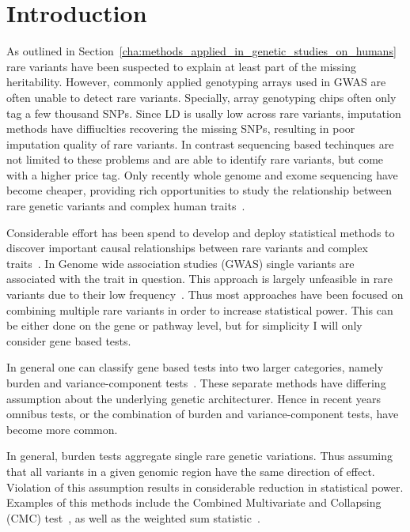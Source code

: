 \section{Introduction}
\label{sec:introduction}

As outlined in Section~\ref{cha:methods_applied_in_genetic_studies_on_humans} rare variants have been suspected to explain at least part of the missing heritability.
However, commonly applied genotyping arrays used in GWAS are often unable to detect rare variants.
Specially, array genotyping chips often only tag a few thousand SNPs.
Since LD is usally low across rare variants, imputation methods have diffiuclties recovering the missing SNPs, resulting in poor imputation quality of rare variants.
In contrast sequencing based techinques are not limited to these problems and are able to identify rare variants, but come with a higher price tag.
Only recently whole genome and exome sequencing have become cheaper, providing rich opportunities to study the relationship between rare genetic variants and complex human traits~\cite{Goodwin2016}.

Considerable effort has been spend to develop and deploy statistical methods to discover important causal relationships between rare variants and complex traits~\cite{Morris2010,Zeng2014,Daye2012,Manuscript2013}.
In Genome wide association studies (GWAS) single variants are associated with the trait in question.
This approach is largely unfeasible in rare variants due to their low frequency~\cite{Lee2014}.
Thus most approaches have been focused on combining multiple rare variants in order to increase statistical power.
This can be either done on the gene or pathway level, but for simplicity I will only consider gene based tests.

In general one can classify gene based tests into two larger categories, namely burden and variance-component tests~\cite{Lee2014}.
These separate methods have differing assumption about the underlying genetic architecturer.
Hence in recent years omnibus tests, or the combination of burden and variance-component tests, have become more common.

In general, burden tests aggregate single rare genetic variations.
Thus assuming that all variants in a given genomic region have the same direction of effect.
Violation of this assumption results in considerable reduction in statistical power.
Examples of this methods include the Combined Multivariate and Collapsing (CMC) test~\cite{Li2008}, as well as the weighted sum statistic~\cite{Madsen2009}.

